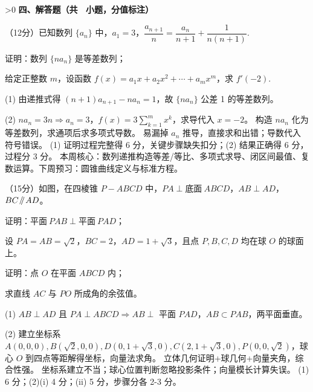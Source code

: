 \ifnum\saqCount>0
\vspace{1em}
\noindent\textbf{四、解答题（共 \saqCount\ 小题，分值标注）}
\vspace{0.3em}
\begin{examenum}[itemsep=\saqItemSep]

    \item （12分）已知数列 $\{a_n\}$ 中，$a_1=3$，$\dfrac{a_{n+1}}{n}=\dfrac{a_n}{n+1}+\dfrac{1}{n(n+1)}$.
    \begin{examenum}
        \item 证明：数列 $\{na_n\}$ 是等差数列；
        \item 给定正整数 $m$，设函数 $f(x)=a_1x+a_2x^2+\cdots+a_mx^m$，求 $f'(-2)$.
    \end{examenum}
    \begin{solution}
        \jieti (1) 由递推式得 $(n+1)a_{n+1}-na_n=1$，故 $\{na_n\}$ 公差 1 的等差数列。\par (2) $na_n=3n\Rightarrow a_n=3$，$f(x)=3\sum_{k=1}^m x^k$，求导代入 $x=-2$。
        \xijie 构造 $na_n$ 化为等差数列，求通项后求多项式导数。
        \cuowu 易漏掉 $a_n$ 推导，直接求和出错；导数代入符号错误。
        \pingfen (1) 证明过程完整得 6 分，关键步骤缺失扣分；(2) 结果正确得 6 分，过程分 3 分。
        \zongjie 本周核心：数列递推构造等差/等比、多项式求导、闭区间最值、复数运算。下周预习：圆锥曲线定义与标准方程。
    \end{solution}

    \item （15分）如图，在四棱锥 $P-ABCD$ 中，$PA\perp \text{底面}\ ABCD$，$AB\perp AD$，$BC\Parallel AD$。
    \begin{examenum}
        \item 证明：$\text{平面}\ PAB\perp \text{平面}\ PAD$；
        \item 设 $PA=AB=\sqrt{2}$，$BC=2$，$AD=1+\sqrt{3}$，且点 $P,B,C,D$ 均在球 $O$ 的球面上。
        \begin{examenum}
            \item 证明：点 $O$ 在平面 $ABCD$ 内；
            \item 求直线 $AC$ 与 $PO$ 所成角的余弦值。
        \end{examenum}
    \end{examenum}
    \begin{solution}
        \jieti (1) $AB\perp AD$ 且 $PA\perp ABCD\Rightarrow AB\perp$ 平面 $PAD$，$AB\subset PAB$，两平面垂直。\par (2) 建立坐标系 $A(0,0,0), B(\sqrt{2},0,0), D(0,1+\sqrt{3},0), C(2,1+\sqrt{3},0), P(0,0,\sqrt{2})$，球心 $O$ 到四点等距解得坐标，向量法求角。
        \xijie 立体几何证明+球几何+向量夹角，综合性强。
        \cuowu 坐标系建立不当；球心位置判断忽略投影条件；向量模长计算失误。
        \pingfen (1) 6 分；(2)(i) 4 分；(ii) 5 分，步骤分各 2-3 分。
    \end{solution}

\end{examenum}
\fi

